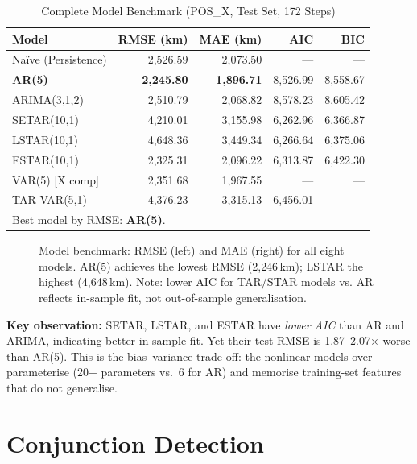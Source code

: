 \documentclass[conference]{IEEEtran}
\begin{document}
\begin{table}[H]
\centering
\caption{Complete Model Benchmark (POS\_X, Test Set, 172 Steps)}
\label{tab:benchmark}
\begin{tabular}{lrrrr}
\toprule
\textbf{Model} & \textbf{RMSE (km)} & \textbf{MAE (km)} & \textbf{AIC} & \textbf{BIC} \\
\midrule
Naïve (Persistence) & 2{,}526.59 & 2{,}073.50 & --- & --- \\
\textbf{AR(5)}       & \textbf{2{,}245.80} & \textbf{1{,}896.71} & 8{,}526.99 & 8{,}558.67 \\
ARIMA(3,1,2)         & 2{,}510.79 & 2{,}068.82 & 8{,}578.23 & 8{,}605.42 \\
SETAR(10,1)          & 4{,}210.01 & 3{,}155.98 & 6{,}262.96 & 6{,}366.87 \\
LSTAR(10,1)          & 4{,}648.36 & 3{,}449.34 & 6{,}266.64 & 6{,}375.06 \\
ESTAR(10,1)          & 2{,}325.31 & 2{,}096.22 & 6{,}313.87 & 6{,}422.30 \\
VAR(5) [X comp]      & 2{,}351.68 & 1{,}967.55 & --- & --- \\
TAR-VAR(5,1)         & 4{,}376.23 & 3{,}315.13 & 6{,}456.01 & --- \\
\bottomrule
\multicolumn{5}{l}{\small Best model by RMSE: \textbf{AR(5)}.}\\
\end{tabular}
\end{table}

\begin{figure}[H]
  \centering
  \fbox{\rule{0pt}{4cm}\rule{\linewidth}{0pt}}
  \caption{Model benchmark: RMSE (left) and MAE (right) for all eight models.
           AR(5) achieves the lowest RMSE (2{,}246\,km); LSTAR the highest
           (4{,}648\,km). Note: lower AIC for TAR/STAR models vs. AR reflects
           in-sample fit, not out-of-sample generalisation.}
  \label{fig:benchmark_bar}
\end{figure}

\textbf{Key observation:} SETAR, LSTAR, and ESTAR have \emph{lower AIC}
than AR and ARIMA, indicating better in-sample fit. Yet their test RMSE is
1.87--2.07$\times$ worse than AR(5). This is the bias--variance trade-off:
the nonlinear models over-parameterise (20+ parameters vs.\ 6 for AR) and
memorise training-set features that do not generalise.

\section{Conjunction Detection}
\label{sec:conjunction}
\end{document}
